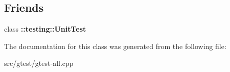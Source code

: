 \subsection*{Friends}
\begin{DoxyCompactItemize}
\item 
\mbox{\label{classtesting_1_1internal_1_1_unit_test_impl_a893404438388dec058dc5c02e8f9a014}} 
class {\bfseries \+::testing\+::\+Unit\+Test}
\end{DoxyCompactItemize}


The documentation for this class was generated from the following file\+:\begin{DoxyCompactItemize}
\item 
src/gtest/gtest-\/all.\+cpp\end{DoxyCompactItemize}

